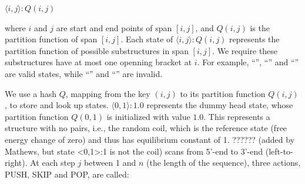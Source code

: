 \begin{center}
$\langle i,j \rangle : Q(i,j)$
\end{center}
where $i$ and $j$ are start and end points of span $[i,j]$, %
and $Q(i,j)$ is the partition function of span $[i,j]$. %
Each state of $\langle i,j \rangle : Q(i,j)$ represents the partition function of possible substructures in span $[i,j]$.
We require these substructures have at most one openning bracket at $i$.
For example, ``\bml\md\md'', ``\bml\bml\bmr'' and ``\md\md\md'' are valid states, 
while ``\bml\bml\md'' and ``\md\bml\md'' are invalid.

We use a hash $Q$, mapping from the key $(i,j)$ to its partition function $Q(i,j)$, 
to store and look up states.   
$\langle 0,1 \rangle:1.0$ represents the dummy head state, 
whose partition function $Q(0,1)$ is initialized with value $1.0$.
This represents a structure with no pairs, 
i.e., the random coil, 
which is the reference state (free energy change of zero) and thus has equilibrium constant of 1.  ?????? (added by Mathews, but state <0,1>:1 is not the coil)
\linearpartition scans from 5'-end to 3'-end (left-to-right).
At each step $j$ between 1 and $n$ (the length of the sequence), 
three actions, PUSH, SKIP and POP, are called:

